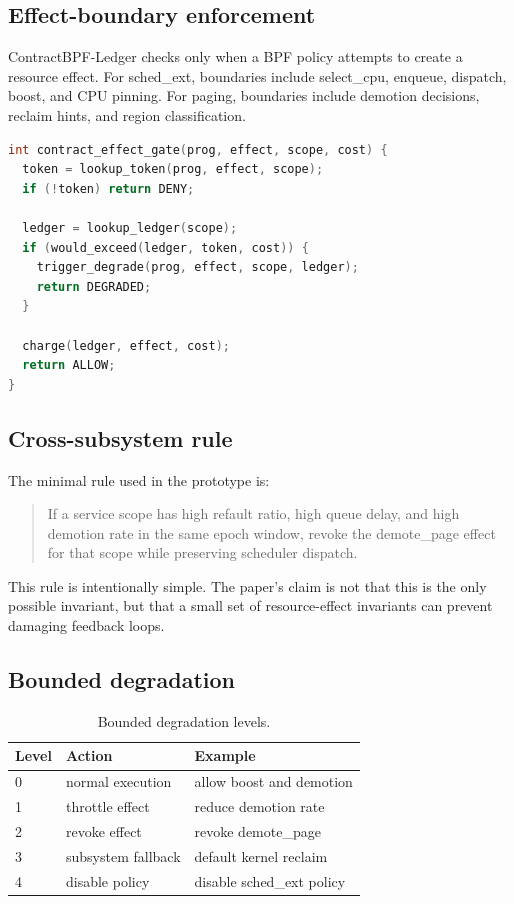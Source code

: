 \documentclass[letterpaper,twocolumn,10pt]{article}
\newcommand{\sys}{ContractBPF-Ledger\xspace}
\begin{document}
\subsection{Effect-boundary enforcement}

\sys checks only when a BPF policy attempts to create a resource effect. For sched\_ext, boundaries include select\_cpu, enqueue, dispatch, boost, and CPU pinning. For paging, boundaries include demotion decisions, reclaim hints, and region classification.

\begin{lstlisting}[language=C,basicstyle=\ttfamily\small]
int contract_effect_gate(prog, effect, scope, cost) {
  token = lookup_token(prog, effect, scope);
  if (!token) return DENY;

  ledger = lookup_ledger(scope);
  if (would_exceed(ledger, token, cost)) {
    trigger_degrade(prog, effect, scope, ledger);
    return DEGRADED;
  }

  charge(ledger, effect, cost);
  return ALLOW;
}
\end{lstlisting}

\subsection{Cross-subsystem rule}

The minimal rule used in the prototype is:

\begin{quote}
If a service scope has high refault ratio, high queue delay, and high demotion rate in the same epoch window, revoke the demote\_page effect for that scope while preserving scheduler dispatch.
\end{quote}

This rule is intentionally simple. The paper's claim is not that this is the only possible invariant, but that a small set of resource-effect invariants can prevent damaging feedback loops.

\subsection{Bounded degradation}

\begin{table}[t]
\centering
\caption{Bounded degradation levels.}
\begin{tabular}{lll}
\toprule
Level & Action & Example \\
\midrule
0 & normal execution & allow boost and demotion \\
1 & throttle effect & reduce demotion rate \\
2 & revoke effect & revoke demote\_page \\
3 & subsystem fallback & default kernel reclaim \\
4 & disable policy & disable sched\_ext policy \\
\bottomrule
\end{tabular}
\end{table}
\end{document}
